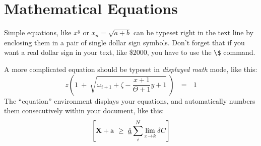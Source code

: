 \documentclass[11pt]{article}
\begin{document}
\section {Mathematical Equations}
Simple equations, like $x^y$ or $x_n = \sqrt{a + b}$ can be typeset right
in the text line by enclosing them in a pair of single dollar sign symbols.
Don't forget that if you want a real dollar sign in your text, like \$2000,
you have to use the \verb+\$+ command.

A more complicated equation should be typeset in {\em displayed math\/} mode,
like this:
\[
z \left( 1 \ +\  \sqrt{\omega_{i+1} + \zeta -\frac{x+1}{\Theta +1} y + 1} 
\ \right)
\ \ \ =\ \ \  1
\]
The ``equation'' environment displays your equations, and automatically
numbers them consecutively within your document, like this:
\begin{equation}
\left[
{\bf X} + {\rm a} \ \geq\ 
\underline{\hat a} \sum_i^N \lim_{x \rightarrow k} \delta C
\right]
\end{equation}
\end{document}
